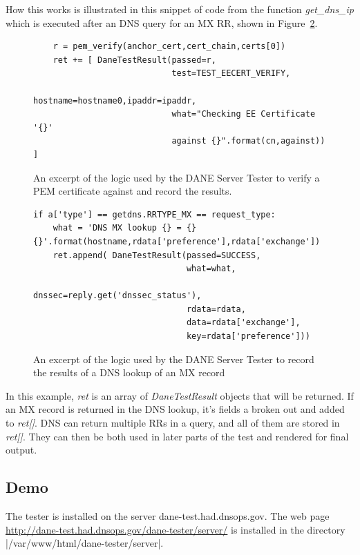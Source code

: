 \documentclass[preprint,3p]{elsarticle}
\begin{document}
How this works is illustrated in this snippet of code from the
function \emph{get\_dns\_ip} which is executed after an DNS query for
an MX RR, shown in Figure~\ref{snippet}. 

\begin{figure}
\begin{lstlisting}
    r = pem_verify(anchor_cert,cert_chain,certs[0])
    ret += [ DaneTestResult(passed=r,
                            test=TEST_EECERT_VERIFY,
                            hostname=hostname0,ipaddr=ipaddr,
                            what="Checking EE Certificate '{}'
                            against {}".format(cn,against)) ]

\end{lstlisting}
\caption{An excerpt of the logic used by the DANE Server Tester to
  verify a PEM certificate against and record the results.}\label{pem-snippet}
\end{figure}


\begin{figure}
\begin{lstlisting}
if a['type'] == getdns.RRTYPE_MX == request_type:
    what = 'DNS MX lookup {} = {} {}'.format(hostname,rdata['preference'],rdata['exchange'])
    ret.append( DaneTestResult(passed=SUCCESS,
                               what=what,
                               dnssec=reply.get('dnssec_status'),
                               rdata=rdata,
                               data=rdata['exchange'],
                               key=rdata['preference']))
\end{lstlisting}
\caption{An excerpt of the logic used by the DANE Server Tester to
  record the results of a DNS lookup of an MX record }\label{snippet}
\end{figure}

In this example, \emph{ret} is an array of \emph{DaneTestResult}
objects that will be returned. If an MX record is returned in the DNS
lookup, it's fields a broken out and added to \emph{ret[]}. DNS can
return multiple RRs in a query, and all of them are stored in
\emph{ret[]}.  They can then be both used in later parts of the test
and rendered for final output.

\subsection{Demo}
The tester is installed on the server dane-test.had.dnsops.gov. The
web page \url{http://dane-test.had.dnsops.gov/dane-tester/server/} is installed in the
directory |/var/www/html/dane-tester/server|.
\end{document}
